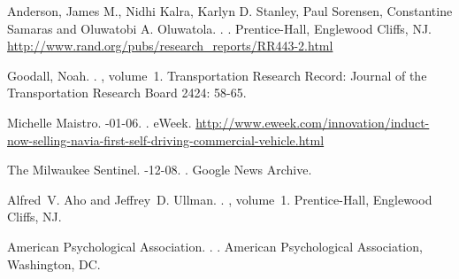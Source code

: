 \documentclass[11pt]{article}
\begin{document}
\begin{thebibliography}{}

Anderson, James M., Nidhi Kalra, Karlyn D. Stanley, Paul Sorensen, Constantine Samaras and Oluwatobi A. Oluwatola.
.
.
\newblock Prentice-{Hall}, Englewood Cliffs, NJ.
\newblock \href{http://www.rand.org/pubs/research\_reports/RR443-2.html}{http://www.rand.org/pubs/research\_reports/RR443-2.html}

Goodall, Noah.
.
, volume~1. 
\newblock Transportation Research Record: Journal of the Transportation Research Board 2424: 58-65.

Michelle Maistro.
-01-06.
.
\newblock eWeek.
\newblock \href{http://www.eweek.com/innovation/induct-now-selling-navia-first-self-driving-commercial-vehicle.html}{http://www.eweek.com/innovation/induct-now-selling-navia-first-self-driving-commercial-vehicle.html}

The Milwaukee Sentinel.
-12-08.
.
\newblock Google News Archive.




Alfred~V. Aho and Jeffrey~D. Ullman.
.
, volume~1.
\newblock Prentice-{Hall}, Englewood Cliffs, NJ.

{American Psychological Association}.
.
.
\newblock American Psychological Association, Washington, DC.


\end{thebibliography}
\end{document}
